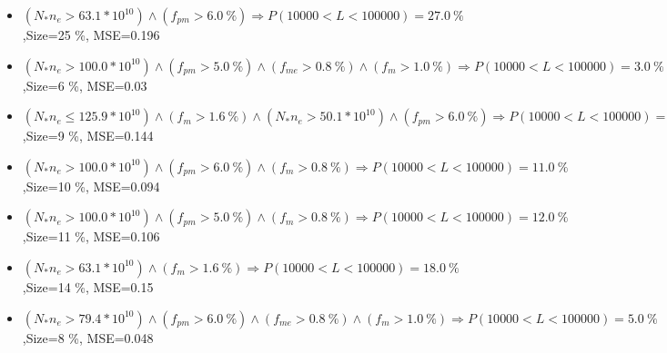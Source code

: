 \documentclass[numbered]{CSL}
\begin{document}
\begin{itemize}
\item $(N_* n_e > 63.1 * 10^{10}) \land (f_{pm} > 6.0~\%) \Rightarrow P(10 000 < L < 100 000) = 27.0~\%$,\hfill Size=25 \%, MSE=0.196
\item $(N_* n_e > 100.0 * 10^{10}) \land (f_{pm} > 5.0~\%) \land (f_{me} > 0.8~\%) \land (f_m > 1.0~\%) \Rightarrow P(10 000 < L < 100 000) = 3.0~\%$,\hfill Size=6 \%, MSE=0.03
\item $(N_* n_e \leq 125.9 * 10^{10}) \land (f_m > 1.6~\%) \land (N_* n_e > 50.1 * 10^{10}) \land (f_{pm} > 6.0~\%) \Rightarrow P(10 000 < L < 100 000) = 17.0~\%$,\hfill Size=9 \%, MSE=0.144
\item $(N_* n_e > 100.0 * 10^{10}) \land (f_{pm} > 6.0~\%) \land (f_m > 0.8~\%) \Rightarrow P(10 000 < L < 100 000) = 11.0~\%$,\hfill Size=10 \%, MSE=0.094
\item $(N_* n_e > 100.0 * 10^{10}) \land (f_{pm} > 5.0~\%) \land (f_m > 0.8~\%) \Rightarrow P(10 000 < L < 100 000) = 12.0~\%$,\hfill Size=11 \%, MSE=0.106
\item $(N_* n_e > 63.1 * 10^{10}) \land (f_m > 1.6~\%) \Rightarrow P(10 000 < L < 100 000) = 18.0~\%$,\hfill Size=14 \%, MSE=0.15
\item $(N_* n_e > 79.4 * 10^{10}) \land (f_{pm} > 6.0~\%) \land (f_{me} > 0.8~\%) \land (f_m > 1.0~\%) \Rightarrow P(10 000 < L < 100 000) = 5.0~\%$,\hfill Size=8 \%, MSE=0.048
\end{itemize}
\end{document}

